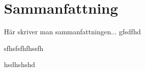 
\section*{Sammanfattning}
Här skriver man sammanfattningen...
gfsdfhd

sfhsfsfhfhssfh

hsdhshshd

\clearpage